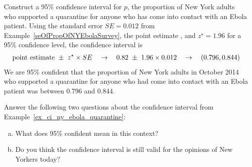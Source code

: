 \begin{examplewrap}
\begin{nexample}{Construct a 95\% confidence interval for $p$,
    the proportion of New York adults who supported a quarantine
    for anyone who has come into contact with an Ebola patient.}
  \label{ex_ci_ny_ebola_quarantine}%
  Using the standard error $SE = 0.012$ from
  Example~\ref{seOfPropOfNYEbolaSurvey},
  the point estimate \wsjebolapollprop{}, and $z^{\star} = 1.96$
  for a 95\% confidence level, the confidence interval is
  \begin{eqnarray*}
  \text{point estimate} \ \pm\ z^{\star} \times SE
    \quad\to\quad 0.82{} \ \pm\ 1.96\times 0.012{}
    \quad\to\quad (0.796, 0.844)
  \end{eqnarray*}
  We are 95\% confident that the proportion of New York adults
  in October 2014 who supported a quarantine for anyone who had come
  into contact with an Ebola patient was between 0.796 and 0.844.
\end{nexample}
\end{examplewrap}

\begin{exercisewrap}
\begin{nexercise}
Answer the following two questions about the confidence interval
from Example~\ref{ex_ci_ny_ebola_quarantine}:\footnotemark{}
\begin{enumerate}[(a)]
\item
    What does 95\% confident mean in this context?
\item
    Do you think the confidence interval is still valid
    for the opinions of New Yorkers today?
\end{enumerate}
\end{nexercise}
\end{exercisewrap}

